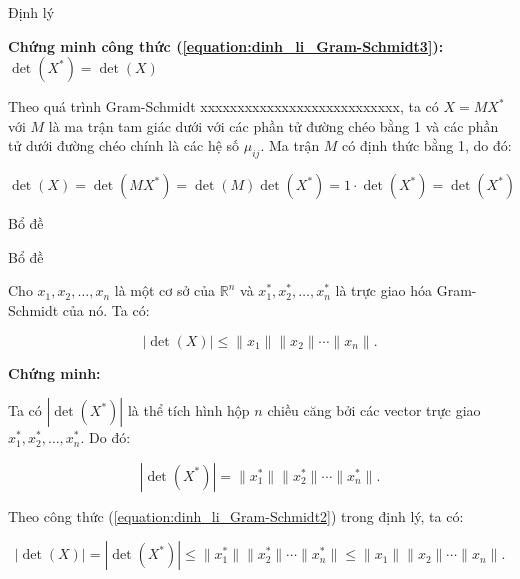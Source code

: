 \documentclass{beamer}
\numberwithin{equation}{section}
\begin{document}
\begin{frame}{Định lý}

\textbf{Chứng minh công thức (\ref{equation:dinh_li_Gram-Schmidt3}):}
$\det(X^*) = \det(X)$


Theo quá trình Gram-Schmidt xxxxxxxxxxxxxxxxxxxxxxxxxxx, ta có $X = MX^*$
với $M$ là ma trận tam giác dưới với các phần tử đường chéo bằng 1 và các phần tử dưới đường chéo chính là các hệ số $\mu_{ij}$.
Ma trận $M$ có định thức bằng 1, do đó:

\[
\det(X) = \det(MX^*) = \det(M) \det(X^*) = 1 \cdot \det(X^*) = \det(X^*)
\]

\end{frame}
\begin{frame}{Bổ đề}

\begin{block}{Bổ đề}

Cho $x_1, x_2, \ldots, x_n$ là một cơ sở của $\mathbb{R}^n$
và $x_1^*, x_2^*, \ldots, x_n^*$ là trực giao hóa Gram-Schmidt của nó.
Ta có:

\[
|\det(X)| \leq \|x_1\|\|x_2\|\cdots\|x_n\|.
\]

\end{block}

\textbf{Chứng minh:}

Ta có $|\det(X^*)|$ là thể tích hình hộp $n$ chiều căng bởi các vector trực giao $x_1^*, x_2^*, \ldots, x_n^*$. Do đó:

\[
|\det(X^*)| = \|x_1^*\|\|x_2^*\|\cdots\|x_n^*\|.
\]

Theo công thức (\ref{equation:dinh_li_Gram-Schmidt2}) trong định lý, ta có:

\[
|\det(X)| = |\det(X^*)| \leq \|x_1^*\|\|x_2^*\|\cdots\|x_n^*\| \leq \|x_1\|\|x_2\|\cdots\|x_n\|.
\]

\end{frame}
\end{document}
